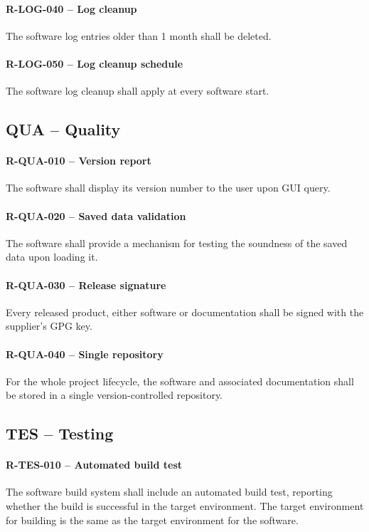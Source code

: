 \paragraph{R-LOG-040 -- Log cleanup}
The software log entries older than 1 month shall be deleted.

\paragraph{R-LOG-050 -- Log cleanup schedule}
The software log cleanup shall apply at every software start.

\subsection{QUA -- Quality}
\paragraph{R-QUA-010 -- Version report}
The software shall display its version number to the user upon GUI query.

\paragraph{R-QUA-020 -- Saved data validation}
The software shall provide a mechanism for testing the soundness of the
saved data upon loading it.

\paragraph{R-QUA-030 -- Release signature}
Every released product, either software or documentation shall be signed
with the supplier's GPG key.

\paragraph{R-QUA-040 -- Single repository}
For the whole project lifecycle, the software and associated documentation shall
be stored in a single version-controlled repository.

\subsection{TES -- Testing}
\paragraph{R-TES-010 -- Automated build test}
The software build system shall include an automated build test, reporting
whether the build is successful in the target environment.
The target environment for building is the same as the target environment for
the software.

